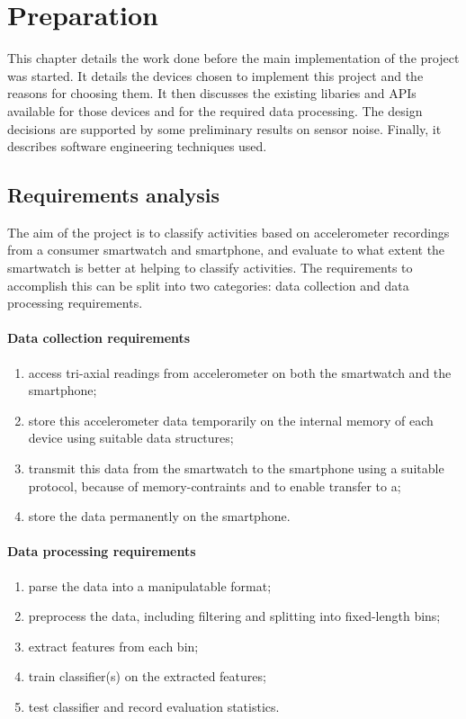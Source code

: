 \chapter{Preparation}
  This chapter details the work done before the main implementation of the project was started. It
  details the devices chosen to implement this project and the reasons for choosing them. It then
  discusses the existing libaries and APIs available for those devices and for the required data
  processing. The design decisions are supported by some preliminary results on sensor noise.  Finally, it describes software engineering techniques used.

  \section{Requirements analysis}
    The aim of the project is to classify activities based on accelerometer recordings from a consumer smartwatch and smartphone, and evaluate to what extent the smartwatch is better at helping to classify activities. The requirements to accomplish this can be split into two categories: data collection and data processing requirements.
    
    \subsubsection{Data collection requirements}
      \begin{enumerate}
        \item access tri-axial readings from accelerometer on both the smartwatch and the smartphone;
        \item store this accelerometer data temporarily on the internal memory of each device using suitable data structures;
        \item transmit this data from the smartwatch to the smartphone using a suitable protocol, because of memory-contraints and to enable transfer to a;
        \item store the data permanently on the smartphone.
      \end{enumerate}
    
    \subsubsection{Data processing requirements}
      \begin{enumerate}
        \item parse the data into a manipulatable format;
        \item preprocess the data, including filtering and splitting into fixed-length bins;
        \item extract features from each bin;
        \item train classifier(s) on the extracted features;
        \item test classifier and record evaluation statistics.
      \end{enumerate}
    

